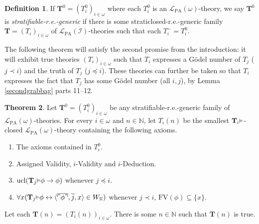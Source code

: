 \documentclass[reqno]{article}
\theoremstyle{definition}
\newtheorem{theorem}{Theorem}
\newtheorem{definition}[theorem]{Definition}
\def\N{\mathbb{N}}
\def\L{\mathscr{L}}
\def\T{\mathbf{T}}
\def\FV{\mathrm{FV}}
\def\LPA{\L_{\mathrm{PA}}}
\def\indset{\mathcal I}
\renewcommand{\Pr}[1]{\T_{#1}\mbox{\small${\vDash}$}}
\newcommand{\ucl}[1]{\mathrm{ucl}(#1)}
\begin{document}
\begin{definition}
If $\T^0=(T^0_i)_{i\in\omega}$ where each $T^0_i$ is an $\LPA(\omega)$-theory,
we say $\T^0$ is \emph{stratifiable-r.e.-generic} if there is
some straticlosed-r.e.-generic family $\T=(T_i)_{i\in\omega}$ of
$\LPA(\indset)$-theories such that
each $T^-_i=T^0_i$.
\end{definition}

The following theorem will satisfy the second promise from the introduction:
it will exhibit true theories $(T_i)_{i\in\omega}$ such that $T_i$ expresses 
a G\"odel number of $T_j$ ($j\prec i$) and the truth of $T_j$ ($j\preceq 
i$).  These theories can further be taken so that $T_i$ expresses the fact 
that $T_j$ has some G\"odel number (all $i,j$), by Lemma \ref{secondgrabbag} parts 11--12.

\begin{theorem}
\label{generalizedtwoonethree}
Let $\T^0=(T^0_i)_{i\in\omega}$ be any
stratifiable-r.e.-generic
family of $\LPA(\omega)$-theories.
For every $i\in\omega$ and $n\in\N$, let $T_i(n)$ be the smallest
$\Pr i$-closed $\LPA(\omega)$-theory containing the following axioms.
\begin{enumerate}
\item The axioms contained in $T^0_i$.
\item Assigned Validity, $i$-Validity and $i$-Deduction.
\item $\ucl{\Pr j\phi\rightarrow\phi}$ whenever $j\preceq i$.
\item $\forall x(\Pr j\phi\leftrightarrow \langle\overline{\ulcorner\phi\urcorner},\overline j,x\rangle\in W_{\overline n})$
whenever $j\prec i$, $\FV(\phi)\subseteq\{x\}$.
\end{enumerate}
Let each $\T(n)=(T_i(n))_{i\in\omega}$.
There is some $n\in\N$ such that $\T(n)$ is true.
\end{theorem}
\end{document}

